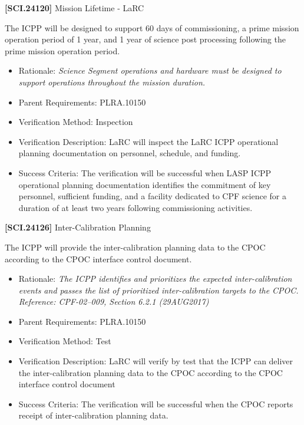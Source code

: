 \documentclass[12pt,oneside,oldfontcommands]{memoir}
\begin{document}
\textbf{[SCI.24120]} Mission Lifetime - \gls{LaRC}

The \gls{ICPP} will be designed to support 60 days of commissioning, a prime mission operation period of 1 year, and 1 year of science post processing following the prime mission operation period.

\begin{itemize}
\item{} Rationale: \emph{Science Segment operations and hardware must be designed to support operations throughout the mission duration.}

\item{} Parent Requirements: PLRA.10150

\item{} Verification Method: Inspection

\item{} Verification Description: \gls{LaRC} will inspect the \gls{LaRC} \gls{ICPP} operational planning documentation on personnel, schedule, and funding.

\item{} Success Criteria: The verification will be successful when \gls{LASP} \gls{ICPP} operational planning documentation identifies the commitment of key personnel, sufficient funding, and a facility dedicated to \gls{CPF} science for a duration of at least two years following commissioning activities.

\end{itemize}

\textbf{[SCI.24126]} Inter-Calibration Planning

The \gls{ICPP} will provide the inter-calibration planning data to the \gls{CPOC} according to the \gls{CPOC} interface control document.

\begin{itemize}
\item{} Rationale: \emph{The ICPP identifies and prioritizes the expected inter-calibration events and passes the list of prioritized inter-calibration targets to the CPOC. Reference: CPF-02--009, Section 6.2.1 (29AUG2017)}

\item{} Parent Requirements: PLRA.10150

\item{} Verification Method: Test

\item{} Verification Description: \gls{LaRC} will verify by \gls{test} that the \gls{ICPP} can deliver the inter-calibration planning data to the \gls{CPOC} according to the \gls{CPOC} interface control document

\item{} Success Criteria: The verification will be successful when the \gls{CPOC} reports receipt of inter-calibration planning data.

\end{itemize}
\end{document}
